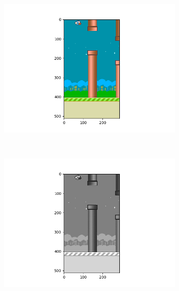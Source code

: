\documentclass[journal]{IEEEtran}
\begin{document}
    \begin{figure}[h]
        \centering
        \begin{subfigure}[b]{0.5\textwidth}
            \includegraphics[width=\textwidth]{images/pre1.png}
            \caption{}
        \end{subfigure}
        ~
        \begin{subfigure}[b]{0.5\textwidth}
            \includegraphics[width=\textwidth]{images/pre2.png}
            \caption{}
        \end{subfigure}
        \begin{subfigure}[b]{0.5\textwidth}

\end{subfigure}
\end{figure}
\end{document}

